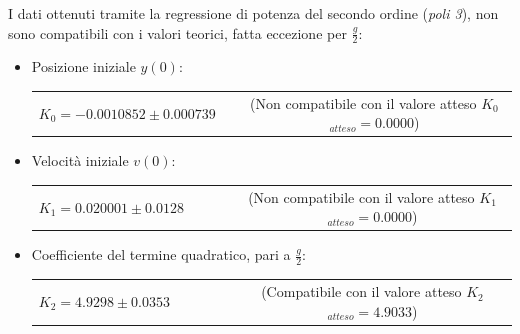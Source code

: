 \documentclass[12pt, a4paper]{article}
\begin{document}
I dati ottenuti tramite la regressione di potenza del secondo ordine (\textit{poli 3}), non sono compatibili con i valori teorici, fatta eccezione per $\frac{g}{2}$:


\renewcommand{\theenumii}{\roman{enumii}}  
\begin{itemize}
    \itemsep0em 
        \item Posizione iniziale $y(0)$:\\
        \begin{tabular}{ccc}
        {$K_0 = -0.0010852 \pm 0.000739$} & & \small{(Non compatibile con il valore atteso $K_{0}$ $_{atteso}= 0.0000$)}  \\
        \end{tabular}
        
    \end{itemize}
    \begin{itemize}
        \item Velocità iniziale $v(0)$:\\
        \begin{tabular}{ccccc}
        {$K_1 =  0.020001 \pm 0.0128$} & & & & \small{(Non compatibile con il valore atteso $K_{1}$ $_{atteso} = 0.0000$)}\\
        \end{tabular}
        
    \end{itemize}
      \begin{itemize}
          \item Coefficiente del termine quadratico, pari a $\displaystyle{\frac{g}{2}}$:\\ 
          \begin{tabular}{cccccc}
              {$K_2 =  4.9298 \pm 0.0353$} & & & & &\small{(Compatibile con il valore atteso $K_{2}$ $_{atteso}= 4.9033$)}\\
          \end{tabular}
         
      \end{itemize}
        
        
\newpage
\end{document}
